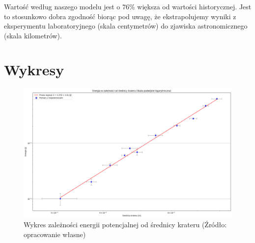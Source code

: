 \documentclass[a4paper,12pt]{article}
\begin{document}
Wartość według naszego modelu jest o $76\%$ większa od wartości historycznej. Jest to stosunkowo dobra zgodność biorąc pod uwagę, że ekstrapolujemy wyniki z eksperymentu laboratoryjnego (skala centymetrów) do zjawiska astronomicznego (skala kilometrów).


\section{Wykresy}

\begin{figure}[H]
    \centering
    \includegraphics[angle=90,height=0.90\textheight]{energia_od_srednicy.png}
    \caption{Wykres zależności energii potencjalnej od średnicy krateru (Źródło: opracowanie własne)}
    \label{rys:energia_od_srednicy}
\end{figure}



\end{document}
